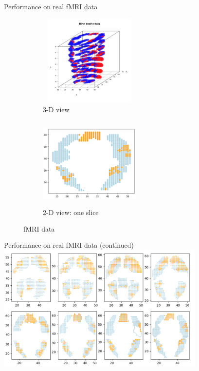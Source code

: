 \documentclass[10pt,mathserif]{beamer}
\begin{document}
\begin{frame}{Performance on real fMRI data}
\begin{figure}[t!]
    \centering
    \begin{subfigure}[t]{0.5\textwidth}
        \centering
        \includegraphics[height=1.8in, width=2in]{../BDC_predictions.jpg}
        \caption{3-D view}
    \end{subfigure}%
    \begin{subfigure}[t]{0.5\textwidth}
        \centering
        \includegraphics[height=1.8in, width=2in]{../BDC_OneSlice}
        \caption{2-D view: one slice}
    \end{subfigure}
    \caption{fMRI data}
\end{figure}
\end{frame}


\begin{frame}{Performance on real fMRI data (continued)}
\centering
\includegraphics[height=2.5in]{../BDC_AllSlices}
\end{frame}
\end{document}
